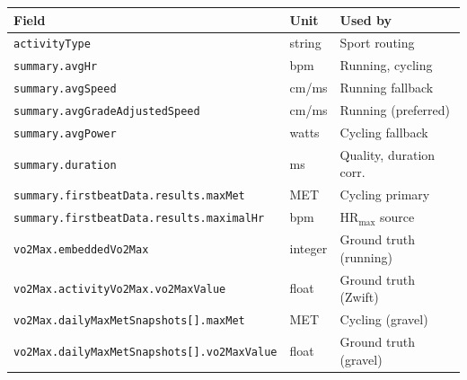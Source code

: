 \documentclass[11pt,a4paper]{article}
\begin{document}
\begin{table}[H]
\centering
\small
\begin{tabular}{@{}p{6.8cm}ll@{}}
\toprule
\textbf{Field} & \textbf{Unit} & \textbf{Used by} \\
\midrule
\texttt{activityType} & string & Sport routing \\
\texttt{summary.avgHr} & bpm & Running, cycling \\
\texttt{summary.avgSpeed} & cm/ms & Running fallback \\
\texttt{summary.avgGradeAdjustedSpeed} & cm/ms & Running (preferred) \\
\texttt{summary.avgPower} & watts & Cycling fallback \\
\texttt{summary.duration} & ms & Quality, duration corr. \\
\texttt{summary.firstbeatData.results\allowbreak{}.maxMet} & MET & Cycling primary \\
\texttt{summary.firstbeatData.results\allowbreak{}.maximalHr} & bpm & HR$_{\text{max}}$ source \\
\texttt{vo2Max.embeddedVo2Max} & integer & Ground truth (running) \\
\texttt{vo2Max.activityVo2Max\allowbreak{}.vo2MaxValue} & float & Ground truth (Zwift) \\
\texttt{vo2Max.dailyMaxMetSnapshots[]\allowbreak{}.maxMet} & MET & Cycling (gravel) \\
\texttt{vo2Max.dailyMaxMetSnapshots[]\allowbreak{}.vo2MaxValue} & float & Ground truth (gravel) \\
\bottomrule
\end{tabular}
\end{table}
\end{document}
